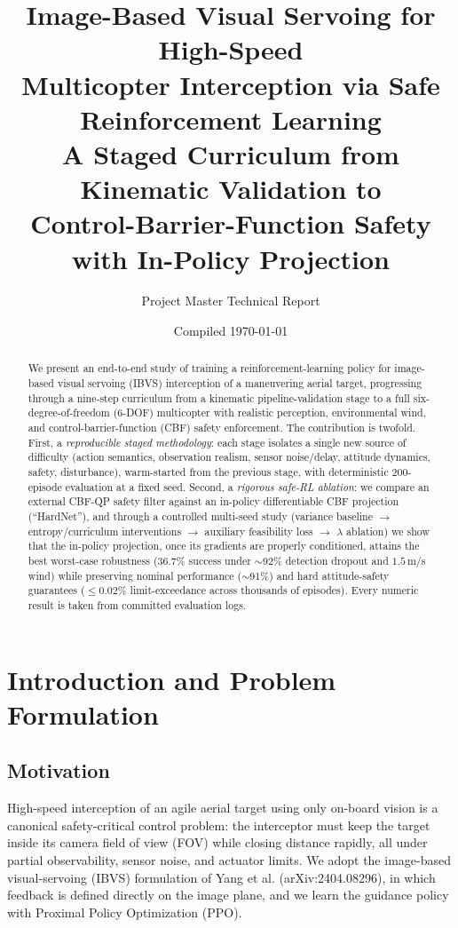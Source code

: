 \documentclass[11pt]{article}
\title{\vspace{-1.2cm}\textbf{Image-Based Visual Servoing for High-Speed\\
Multicopter Interception via Safe Reinforcement Learning}\\[4pt]
\large A Staged Curriculum from Kinematic Validation to\\
Control-Barrier-Function Safety with In-Policy Projection}
\author{Project Master Technical Report}
\date{Compiled \today}
\begin{document}
\maketitle
\thispagestyle{fancy}

\begin{abstract}
\noindent
We present an end-to-end study of training a reinforcement-learning policy
for image-based visual servoing (IBVS) interception of a maneuvering aerial
target, progressing through a nine-step curriculum from a kinematic
pipeline-validation stage to a full six-degree-of-freedom (6-DOF)
multicopter with realistic perception, environmental wind, and
control-barrier-function (CBF) safety enforcement. The contribution is twofold.
First, a \emph{reproducible staged methodology}: each stage isolates a single
new source of difficulty (action semantics, observation realism, sensor
noise/delay, attitude dynamics, safety, disturbance), warm-started from the
previous stage, with deterministic 200-episode evaluation at a fixed seed.
Second, a \emph{rigorous safe-RL ablation}: we compare an external CBF-QP
safety filter against an in-policy differentiable CBF projection (``HardNet''),
and through a controlled multi-seed study (variance baseline $\rightarrow$
entropy/curriculum interventions $\rightarrow$ auxiliary feasibility loss
$\rightarrow$ $\lambda$ ablation) we show that the in-policy projection,
once its gradients are properly conditioned, attains the best worst-case
robustness ($36.7\%$ success under $\sim$92\% detection dropout and
$1.5\,$m/s wind) while preserving nominal performance ($\sim$91\%) and
hard attitude-safety guarantees ($\le 0.02\%$ limit-exceedance across
thousands of episodes). Every numeric result is taken from committed
evaluation logs.
\end{abstract}

\tableofcontents
\newpage

\section{Introduction and Problem Formulation}
\subsection{Motivation}
High-speed interception of an agile aerial target using only on-board vision
is a canonical safety-critical control problem: the interceptor must keep the
target inside its camera field of view (FOV) while closing distance rapidly,
all under partial observability, sensor noise, and actuator limits. We adopt
the image-based visual-servoing (IBVS) formulation of Yang et al.
(arXiv:2404.08296), in which feedback is defined directly on the image plane,
and we learn the guidance policy with Proximal Policy Optimization (PPO).
\end{document}
